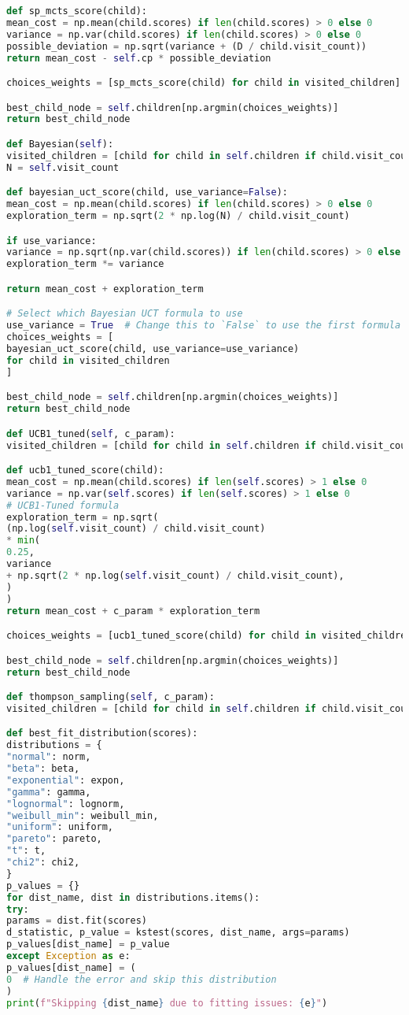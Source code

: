 \begin{lstlisting}[language = Python]
def sp_mcts_score(child):
mean_cost = np.mean(child.scores) if len(child.scores) > 0 else 0
variance = np.var(child.scores) if len(child.scores) > 0 else 0
possible_deviation = np.sqrt(variance + (D / child.visit_count))
return mean_cost - self.cp * possible_deviation

choices_weights = [sp_mcts_score(child) for child in visited_children]

best_child_node = self.children[np.argmin(choices_weights)]
return best_child_node

def Bayesian(self):
visited_children = [child for child in self.children if child.visit_count > 0]
N = self.visit_count

def bayesian_uct_score(child, use_variance=False):
mean_cost = np.mean(child.scores) if len(child.scores) > 0 else 0
exploration_term = np.sqrt(2 * np.log(N) / child.visit_count)

if use_variance:
variance = np.sqrt(np.var(child.scores)) if len(child.scores) > 0 else 0
exploration_term *= variance

return mean_cost + exploration_term

# Select which Bayesian UCT formula to use
use_variance = True  # Change this to `False` to use the first formula
choices_weights = [
bayesian_uct_score(child, use_variance=use_variance)
for child in visited_children
]

best_child_node = self.children[np.argmin(choices_weights)]
return best_child_node

def UCB1_tuned(self, c_param):
visited_children = [child for child in self.children if child.visit_count > 0]

def ucb1_tuned_score(child):
mean_cost = np.mean(child.scores) if len(self.scores) > 1 else 0
variance = np.var(self.scores) if len(self.scores) > 1 else 0
# UCB1-Tuned formula
exploration_term = np.sqrt(
(np.log(self.visit_count) / child.visit_count)
* min(
0.25,
variance
+ np.sqrt(2 * np.log(self.visit_count) / child.visit_count),
)
)
return mean_cost + c_param * exploration_term

choices_weights = [ucb1_tuned_score(child) for child in visited_children]

best_child_node = self.children[np.argmin(choices_weights)]
return best_child_node

def thompson_sampling(self, c_param):
visited_children = [child for child in self.children if child.visit_count > 0]

def best_fit_distribution(scores):
distributions = {
"normal": norm,
"beta": beta,
"exponential": expon,
"gamma": gamma,
"lognormal": lognorm,
"weibull_min": weibull_min,
"uniform": uniform,
"pareto": pareto,
"t": t,
"chi2": chi2,
}
p_values = {}
for dist_name, dist in distributions.items():
try:
params = dist.fit(scores)
d_statistic, p_value = kstest(scores, dist_name, args=params)
p_values[dist_name] = p_value
except Exception as e:
p_values[dist_name] = (
0  # Handle the error and skip this distribution
)
print(f"Skipping {dist_name} due to fitting issues: {e}")


\end{lstlisting}
